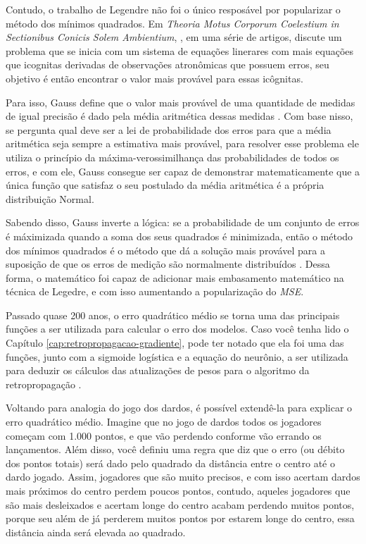 Contudo, o trabalho de Legendre não foi o único resposável por popularizar o método dos mínimos quadrados. Em \textit{Theoria Motus Corporum Coelestium in Sectionibus Conicis Solem Ambientium}, \textcite{Gauss1809}, em uma série de artigos, discute um problema que se inicia com um sistema de equações linerares com mais equações que icognitas derivadas de observações atronômicas que possuem erros, seu objetivo é então encontrar o valor mais provável para essas icôgnitas.

Para isso, Gauss define que o valor mais provável de uma quantidade de medidas de igual precisão é dado pela média aritmética dessas medidas \parencite{Gauss1809}. Com base nisso, \textcite{Gauss1809} se pergunta qual deve ser a lei de probabilidade dos erros para que a média aritmética seja sempre a estimativa mais provável, para resolver esse problema ele utiliza o princípio da máxima-verossimilhança das probabilidades de todos os erros, e com ele, Gauss consegue ser capaz de demonstrar matematicamente que a única função que satisfaz o seu postulado da média aritmética é a própria distribuição Normal.

Sabendo disso, Gauss inverte a lógica: se a probabilidade de um conjunto de erros é máximizada quando a soma dos seus quadrados é minimizada, então o método dos mínimos quadrados é o método que dá a solução mais provável para a suposição de que os erros de medição são normalmente distribuídos \parencite{Gauss1809}. Dessa forma, o matemático foi capaz de adicionar mais embasamento matemático na técnica de Legedre, e com isso aumentando a popularização do \textit{MSE}.

Passado quase 200 anos, o erro quadrático médio se torna uma das principais funções a ser utilizada para calcular o erro dos modelos. Caso você tenha lido o Capítulo \ref{cap:retropropagacao-gradiente}, pode ter notado que ela foi uma das funções, junto com a sigmoide logística e a equação do neurônio, a ser utilizada para deduzir os cálculos das atualizações de pesos para o algoritmo da retropropagação \parencite{BackpropagationArticle}.

Voltando para analogia do jogo dos dardos, é possível extendê-la para explicar o erro quadrático médio. Imagine que no jogo de dardos todos os jogadores começam com 1.000 pontos, e que vão perdendo conforme vão errando os lançamentos. Além disso, você definiu uma regra que diz que o erro (ou débito dos pontos totais) será dado pelo quadrado da distância entre o centro até o dardo jogado. Assim, jogadores que são muito precisos, e com isso acertam dardos mais próximos do centro perdem poucos pontos, contudo, aqueles jogadores que são mais desleixados e acertam longe do centro acabam perdendo muitos pontos, porque seu além de já perderem muitos pontos por estarem longe do centro, essa distância ainda será elevada ao quadrado.

